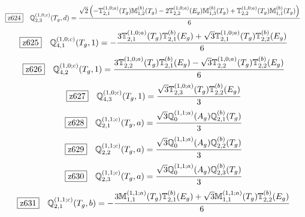 \documentclass[fleqn,10pt,landscape]{jsarticle}
\begin{document}
\begin{dmath*}
\hspace*{3mm}\fbox{z624}\quad \mathbb{Q}_{2,3}^{(1,0;c)}(T_{g},d)=\frac{\sqrt{2} \left(- \mathbb{T}_{2,1}^{(1,0;a)}(T_{g}) \mathbb{M}_{1,2}^{(b)}(T_{g}) - 2 \mathbb{T}_{2,2}^{(1,0;a)}(E_{g}) \mathbb{M}_{1,3}^{(b)}(T_{g}) + \mathbb{T}_{2,2}^{(1,0;a)}(T_{g}) \mathbb{M}_{1,1}^{(b)}(T_{g})\right)}{6}
\end{dmath*}
\begin{dmath*}
\hspace*{3mm}\fbox{z625}\quad \mathbb{Q}_{4,1}^{(1,0;c)}(T_{g},1)=- \frac{3 \mathbb{T}_{2,1}^{(1,0;a)}(T_{g}) \mathbb{T}_{2,1}^{(b)}(E_{g}) + \sqrt{3} \mathbb{T}_{2,1}^{(1,0;a)}(T_{g}) \mathbb{T}_{2,2}^{(b)}(E_{g})}{6}
\end{dmath*}
\begin{dmath*}
\hspace*{3mm}\fbox{z626}\quad \mathbb{Q}_{4,2}^{(1,0;c)}(T_{g},1)=\frac{3 \mathbb{T}_{2,2}^{(1,0;a)}(T_{g}) \mathbb{T}_{2,1}^{(b)}(E_{g}) - \sqrt{3} \mathbb{T}_{2,2}^{(1,0;a)}(T_{g}) \mathbb{T}_{2,2}^{(b)}(E_{g})}{6}
\end{dmath*}
\begin{dmath*}
\hspace*{3mm}\fbox{z627}\quad \mathbb{Q}_{4,3}^{(1,0;c)}(T_{g},1)=\frac{\sqrt{3} \mathbb{T}_{2,3}^{(1,0;a)}(T_{g}) \mathbb{T}_{2,2}^{(b)}(E_{g})}{3}
\end{dmath*}
\begin{dmath*}
\hspace*{3mm}\fbox{z628}\quad \mathbb{Q}_{2,1}^{(1,1;c)}(T_{g},a)=\frac{\sqrt{3} \mathbb{Q}_{0}^{(1,1;a)}(A_{g}) \mathbb{Q}_{2,1}^{(b)}(T_{g})}{3}
\end{dmath*}
\begin{dmath*}
\hspace*{3mm}\fbox{z629}\quad \mathbb{Q}_{2,2}^{(1,1;c)}(T_{g},a)=\frac{\sqrt{3} \mathbb{Q}_{0}^{(1,1;a)}(A_{g}) \mathbb{Q}_{2,2}^{(b)}(T_{g})}{3}
\end{dmath*}
\begin{dmath*}
\hspace*{3mm}\fbox{z630}\quad \mathbb{Q}_{2,3}^{(1,1;c)}(T_{g},a)=\frac{\sqrt{3} \mathbb{Q}_{0}^{(1,1;a)}(A_{g}) \mathbb{Q}_{2,3}^{(b)}(T_{g})}{3}
\end{dmath*}
\begin{dmath*}
\hspace*{3mm}\fbox{z631}\quad \mathbb{Q}_{2,1}^{(1,1;c)}(T_{g},b)=- \frac{3 \mathbb{M}_{1,1}^{(1,1;a)}(T_{g}) \mathbb{T}_{2,1}^{(b)}(E_{g}) + \sqrt{3} \mathbb{M}_{1,1}^{(1,1;a)}(T_{g}) \mathbb{T}_{2,2}^{(b)}(E_{g})}{6}
\end{dmath*}
\end{document}

